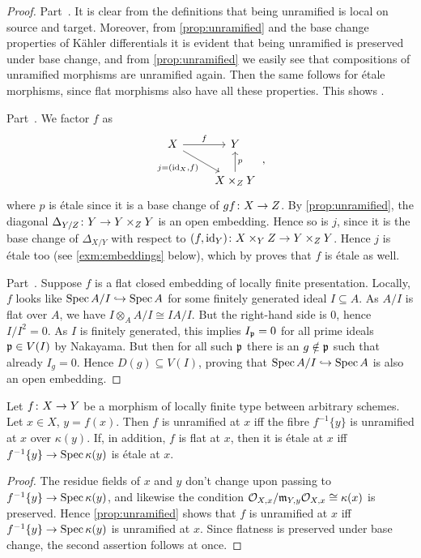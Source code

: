 \begin{proof}
	Part~. It is clear from the definitions that being unramified is local on source and target. Moreover, from \cref{prop:unramified} and the base change properties of Kähler differentials it is evident that being unramified is preserved under base change, and from \cref{prop:unramified} we easily see that compositions of unramified morphisms are unramified again. Then the same follows for étale morphisms, since flat morphisms also have all these properties. This shows .
	
	Part~. We factor $f$ as
	\begin{equation*}
		\begin{tikzcd}
			X\rar["f"]\drar["{j=(\id_X,f)}"{swap}]& Y\\
			& X\times_ZY\uar["p"{swap}]
		\end{tikzcd}\,,
	\end{equation*}
	where $p$ is étale since it is a base change of $gf\colon X\morphism Z$. By \cref{prop:unramified}, the diagonal $\Delta_{Y/Z}\colon Y\morphism Y\times_ZY$ is an open embedding. Hence so is $j$, since it is the base change of $\Delta_{X/Y}$ with respect to $(f,\id_Y)\colon X\times_YZ\morphism Y\times_ZY$. Hence $j$ is étale too (see \cref{exm:embeddings} below), which by  proves that $f$ is étale as well.
	
	Part~. Suppose $f$ is a flat closed embedding of locally finite presentation. Locally, $f$ looks like $\Spec A/I\monomorphism \Spec A$ for some finitely generated ideal $I\subseteq A$. As $A/I$ is flat over $A$, we have $I\otimes_AA/I\cong IA/I$. But the right-hand side is $0$, hence $I/I^2=0$. As $I$ is finitely generated, this implies $I_{\mathfrak{p}}=0$ for all prime ideals $\mathfrak{p}\in V(I)$ by Nakayama. But then for all such $\mathfrak{p}$ there is an $g\notin\mathfrak{p}$ such that already $I_g=0$. Hence $D(g)\subseteq V(I)$, proving that $\Spec A/I\monomorphism\Spec A$ is also an open embedding.
\end{proof}
\begin{fact}\label{fact:etaleFibres}
	Let $f\colon X\morphism Y$ be a morphism of locally finite type between arbitrary schemes. Let $x\in X$, $y=f(x)$. Then $f$ is unramified at $x$ iff the fibre $f^{-1}\{y\}$ is unramified at $x$ over $\kappa(y)$. If, in addition, $f$ is flat at $x$, then it is étale at $x$ iff $f^{-1}\{y\}\morphism\Spec \kappa(y)$ is étale at $x$.
\end{fact}
\begin{proof}
	The residue fields of $x$ and $y$ don't change upon passing to $f^{-1}\{y\}\morphism\Spec\kappa(y)$, and likewise the condition $\mathcal{O}_{X,x}/\mathfrak{m}_{Y,y}\mathcal{O}_{X,x}\cong \kappa(x)$ is preserved. Hence \cref{prop:unramified} shows that $f$ is unramified at $x$ iff $f^{-1}\{y\}\morphism\Spec\kappa(y)$ is unramified at $x$. Since flatness is preserved under base change, the second assertion follows at once.
\end{proof}
